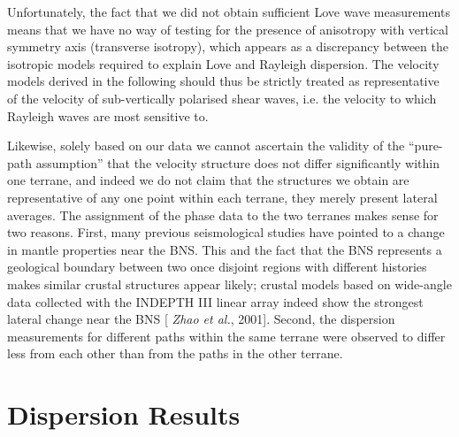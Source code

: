 \documentclass[12pt]{article}
\begin{document}
 Unfortunately, the fact that we did not obtain sufficient Love
wave measurements means that we have no way of testing for the presence
  of anisotropy with vertical symmetry axis (transverse isotropy), which
 appears as a discrepancy between the isotropic models required to explain Love and
 Rayleigh dispersion.  The velocity models derived in the following should thus
 be strictly treated as representative of the velocity of sub-vertically
 polarised shear waves, i.e. the velocity to which Rayleigh waves are most
 sensitive to.

Likewise, solely based on our data we cannot ascertain the validity of the
  ``pure-path assumption'' that the
  velocity structure does not differ significantly within one terrane, and
  indeed we do not claim that the structures we obtain are representative of any
  one point within each terrane, they merely present lateral averages.  The
  assignment of the phase data to the two terranes makes sense for two reasons.
First, many previous seismological studies have pointed to a change in mantle
  properties near the BNS.  This and the
  fact that the BNS represents a geological boundary between two once disjoint
  regions with different histories makes similar crustal
  structures appear likely; crustal models based on wide-angle data collected with the INDEPTH
  III linear array indeed show the strongest lateral change near the BNS [{\it
    Zhao et al.}, 2001].  Second, the dispersion measurements for different paths within the same terrane
  were observed to differ less from each other than from the paths
  in the other terrane.


\section{Dispersion Results}
\end{document}

